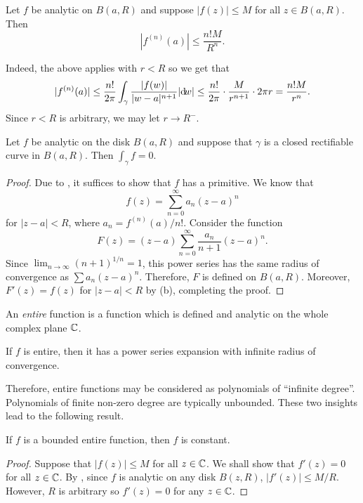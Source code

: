 	\begin{corollary}
		\label{theo: cauchys estimate}
		Let $f$ be analytic on $B(a,R)$ and suppose $|f(z)| \le M$ for all $z \in B(a,R)$. Then
		\[ |f^{(n)}(a)| \le \frac{n!M}{R^n}. \]
	\end{corollary}
	Indeed, the above applies with $r < R$ so we get that
	\[ |f^{(n)}(a)| \le \frac{n!}{2\pi} \int_\gamma \frac{|f(w)|}{|w-a|^{n+1}} |{\dif} {w}| \le \frac{n!}{2\pi} \cdot \frac{M}{r^{n+1}} \cdot 2\pi r = \frac{n!M}{r^n}. \]
	Since $r < R$ is arbitrary, we may let $r \to R^{-}$.

	\begin{prop}
		Let $f$ be analytic on the disk $B(a,R)$ and suppose that $\gamma$ is a closed rectifiable curve in $B(a,R)$. Then $\int_\gamma f = 0$.
	\end{prop}
	\begin{proof}
		Due to , it suffices to show that $f$ has a primitive. We know that
		\[ f(z) = \sum_{n=0}^{\infty} a_n (z-a)^n \]
		for $|z-a| < R$, where $a_n = f^{(n)}(a)/n!$. Consider the function
		\[ F(z) = (z-a) \sum_{n=0}^{\infty} \frac{a_n}{n+1} (z-a)^{n}. \]
		Since $\lim_{n\to\infty} (n+1)^{1/n} = 1$, this power series has the same radius of convergence as $\sum a_n (z-a)^n$. Therefore, $F$ is defined on $B(a,R)$. Moreover, $F'(z) = f(z)$ for $|z-a| < R$ by (b), completing the proof.
	\end{proof}

	\begin{fdef}
		An \emph{entire} function is a function which is defined and analytic on the whole complex plane $\mathbb{C}$.
	\end{fdef}

	\begin{prop}
		If $f$ is entire, then it has a power series expansion with infinite radius of convergence.
	\end{prop}
	Therefore, entire functions may be considered as polynomials of ``infinite degree''. Polynomials of finite non-zero degree are typically unbounded. These two insights lead to the following result.

	\begin{ftheo}
		\label{liouvilles theorem}
		If $f$ is a bounded entire function, then $f$ is constant.
	\end{ftheo}
	\begin{proof}
		Suppose that $|f(z)| \le M$ for all $z \in \mathbb{C}$. We shall show that $f'(z) = 0$ for all $z \in \mathbb{C}$. By , since $f$ is analytic on any disk $B(z,R)$, $|f'(z)| \le M/R$. However, $R$ is arbitrary so $f'(z) = 0$ for any $z \in \mathbb{C}$.
	\end{proof}

